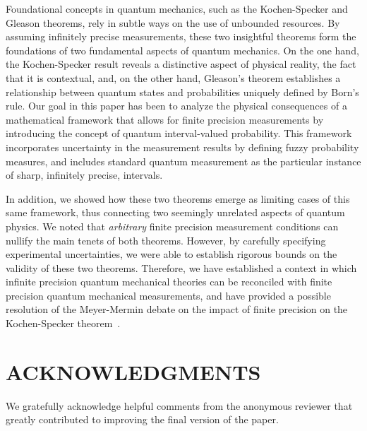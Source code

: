 \documentclass[english,reprint, aps, prl,superscriptaddress, showpacs,
showkeys, longbibliography, amsmath, amssymb, floatfix]{revtex4-1}
\theoremstyle{plain}
\theoremstyle{definition}
\newcommand{\says}[3]{\begin{framed}\begin{minipage}{0.9\linewidth}\color{#1}{#2 says: #3}\end{minipage}\end{framed}}
\newcommand{\andy}[1]{\says{blue}{Andy}{#1}}
\begin{document}
Foundational concepts in quantum mechanics, such as the Kochen-Specker
and Gleason theorems, rely in subtle ways on the use of
unbounded resources. By assuming infinitely precise measurements,
these two insightful theorems form the foundations of two fundamental aspects of
quantum mechanics. On the one hand, the Kochen-Specker result reveals a
distinctive aspect of physical reality, the fact that it is
contextual, and, on the other hand, Gleason's theorem establishes a
relationship between quantum states and probabilities uniquely defined
by Born's rule.  Our goal in this paper has been to analyze the
physical consequences of a mathematical framework that allows for
finite precision measurements by introducing the concept of quantum
interval-valued probability. This framework incorporates uncertainty
in the measurement results by defining fuzzy probability measures, and
includes standard quantum measurement as the particular instance of
sharp, infinitely precise, intervals.  

In addition, we showed how these two theorems emerge as limiting cases
of this same framework, thus connecting two seemingly unrelated
aspects of quantum physics. We noted that {\it arbitrary\/} finite
precision measurement conditions can nullify the main tenets of both
theorems. However, by carefully specifying experimental uncertainties,
we were able to establish rigorous bounds on the validity of these two
theorems. Therefore, we have established a context in which infinite
precision quantum mechanical theories can be reconciled with finite
precision quantum mechanical measurements, and have provided a
possible resolution of the Meyer-Mermin debate on the impact of finite
precision on the Kochen-Specker
theorem~\cite{PhysRevLett.83.3751,Mermin1999}.

\section*{ACKNOWLEDGMENTS}

\begin{acknowledgments}
We gratefully acknowledge helpful comments from the anonymous reviewer that
greatly contributed to improving the final version of the paper.
\end{acknowledgments}

\end{document}

